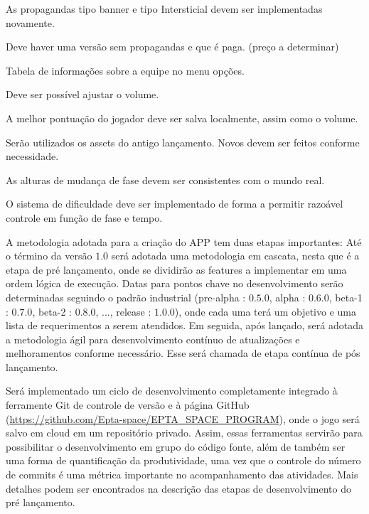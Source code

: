 {    \begin{description}[font=$\bullet$~\normalfont\scshape]
        \item [Propaganda] As propagandas tipo banner e tipo Intersticial devem ser implementadas novamente.
        \item [Versão paga] Deve haver uma versão sem propagandas e que é paga. (preço a determinar)
        \item [Tabela Info] Tabela de informações sobre a equipe no menu opções.
        \item [Volume] Deve ser possível ajustar o volume.
        \item [Salvar] A melhor pontuação do jogador deve ser salva localmente, assim como o volume.
        \item [Assests reutilizados] Serão utilizados os assets do antigo lançamento. Novos devem ser feitos conforme necessidade.
        \item [Alturas reais] As alturas de mudança de fase devem ser consistentes com o mundo real.
        \item [Dificuldade crescente] O sistema de dificuldade deve ser implementado de forma a permitir razoável controle em função de fase e tempo.
    \end{description}

    A metodologia adotada para a criação do APP tem duas etapas importantes: Até o término da versão $1.0$ será adotada uma metodologia em cascata, nesta que é a etapa de pré lançamento, onde se dividirão as features a implementar em uma ordem lógica de execução. 
    Datas para pontos chave no desenvolvimento serão determinadas seguindo o padrão industrial (pre-alpha : $0.5.0$, alpha : $0.6.0$, beta-1 : $0.7.0$, beta-2 : $0.8.0$, ..., release : $1.0.0$), onde cada uma terá um objetivo e uma lista de requerimentos a serem atendidos.
    Em seguida, após lançado, será adotada a metodologia ágil para desenvolvimento contínuo de atualizações e melhoramentos conforme necessário. Esse será chamada de etapa contínua de pós lançamento.

    Será implementado um ciclo de desenvolvimento completamente integrado à ferramente Git de controle de versão e à página GitHub (\url{https://github.com/Epta-space/EPTA_SPACE_PROGRAM}), onde o jogo será salvo em cloud em um repositório privado.
    Assim, essas ferramentas servirão para possibilitar o desenvolvimento em grupo do código fonte, além de também ser uma forma de quantificação da produtividade, uma vez que o controle do número de commits é uma métrica importante no acompanhamento das atividades.
    Mais detalhes podem ser encontrados na descrição das etapas de desenvolvimento do pré lançamento.

}
